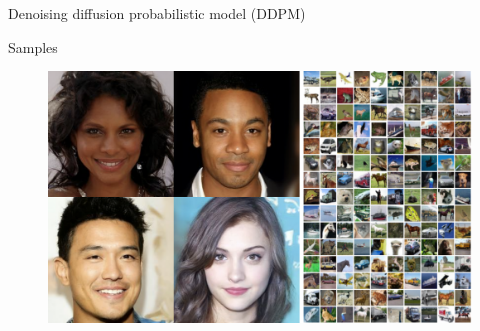 \begin{frame}{Denoising diffusion probabilistic model (DDPM)}
	\begin{block}{Samples}
		\begin{figure}
			\includegraphics[width=\linewidth]{figs/ddpm_samples}
		\end{figure}
	\end{block}
\end{frame}
